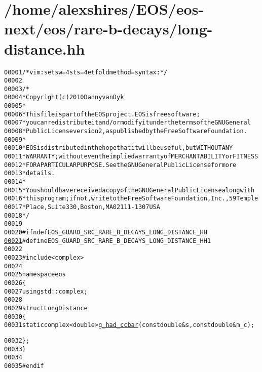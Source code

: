 \hypertarget{long-distance_8hh_source}{
\section{/home/alexshires/EOS/eos-\/next/eos/rare-\/b-\/decays/long-\/distance.hh}
}


\begin{footnotesize}\begin{alltt}
00001 \textcolor{comment}{/* vim: set sw=4 sts=4 et foldmethod=syntax : */}
00002 
00003 \textcolor{comment}{/*}
00004 \textcolor{comment}{ * Copyright (c) 2010 Danny van Dyk}
00005 \textcolor{comment}{ *}
00006 \textcolor{comment}{ * This file is part of the EOS project. EOS is free software;}
00007 \textcolor{comment}{ * you can redistribute it and/or modify it under the terms of the GNU General}
00008 \textcolor{comment}{ * Public License version 2, as published by the Free Software Foundation.}
00009 \textcolor{comment}{ *}
00010 \textcolor{comment}{ * EOS is distributed in the hope that it will be useful, but WITHOUT ANY}
00011 \textcolor{comment}{ * WARRANTY; without even the implied warranty of MERCHANTABILITY or FITNESS}
00012 \textcolor{comment}{ * FOR A PARTICULAR PURPOSE.  See the GNU General Public License for more}
00013 \textcolor{comment}{ * details.}
00014 \textcolor{comment}{ *}
00015 \textcolor{comment}{ * You should have received a copy of the GNU General Public License along with}
00016 \textcolor{comment}{ * this program; if not, write to the Free Software Foundation, Inc., 59 Temple}
00017 \textcolor{comment}{ * Place, Suite 330, Boston, MA  02111-1307  USA}
00018 \textcolor{comment}{ */}
00019 
00020 \textcolor{preprocessor}{#ifndef EOS\_GUARD\_SRC\_RARE\_B\_DECAYS\_LONG\_DISTANCE\_HH}
\hypertarget{long-distance_8hh_source_l00021}{}\hyperlink{long-distance_8hh_a6e254a685e9ebb5bade719ae2cb759fc}{00021} \textcolor{preprocessor}{}\textcolor{preprocessor}{#define EOS\_GUARD\_SRC\_RARE\_B\_DECAYS\_LONG\_DISTANCE\_HH 1}
00022 \textcolor{preprocessor}{}
00023 \textcolor{preprocessor}{#include <complex>}
00024 
00025 \textcolor{keyword}{namespace }eos
00026 \{
00027     \textcolor{keyword}{using} std::complex;
00028 
\hypertarget{long-distance_8hh_source_l00029}{}\hyperlink{structeos_1_1LongDistance}{00029}     \textcolor{keyword}{struct }\hyperlink{structeos_1_1LongDistance}{LongDistance}
00030     \{
00031         \textcolor{keyword}{static} complex<double> \hyperlink{structeos_1_1LongDistance_a06532a8a99890b06046532e3d05317d0}{g_had_ccbar}(\textcolor{keyword}{const} \textcolor{keywordtype}{double} & s, \textcolor{keyword}{const} \textcolor{keywordtype}{double} & m\_c);
      
00032     \};
00033 \}
00034 
00035 \textcolor{preprocessor}{#endif}
\end{alltt}\end{footnotesize}
